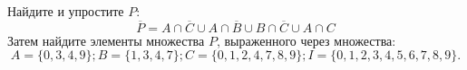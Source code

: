 \question
Найдите и упростите $P$:
\begin{equation*}
\overline{P} = A \cap \overline{C} \cup A \cap \overline{B} \cup B \cap \overline{C} \cup A \cap C
\end{equation*}
Затем найдите элементы множества $P$, выраженного через множества:
\begin{equation*}
	A = \{0, 3, 4, 9\}; 
	B = \{1, 3, 4, 7\};
	C = \{0, 1, 2, 4, 7, 8, 9\};
	I = \{0, 1, 2, 3, 4, 5, 6, 7, 8, 9\}.
\end{equation*}